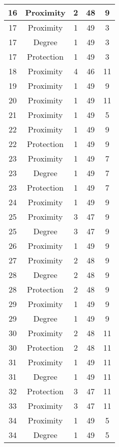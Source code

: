 \documentclass[results.tex]{subfiles}
\begin{document}
\begin{center}
\begin{tabular}{| c || c | c | c | c |}
    \hline
    16 & Proximity & 2 & 48 & 9 \\ 
    \hline
    17 & Proximity & 1 & 49 & 3 \\ 
    \hline
    17 & Degree & 1 & 49 & 3 \\ 
    \hline
    17 & Protection & 1 & 49 & 3 \\ 
    \hline
    18 & Proximity & 4 & 46 & 11 \\ 
    \hline
    19 & Proximity & 1 & 49 & 9 \\ 
    \hline
    20 & Proximity & 1 & 49 & 11 \\ 
    \hline
    21 & Proximity & 1 & 49 & 5 \\ 
    \hline
    22 & Proximity & 1 & 49 & 9 \\ 
    \hline
    22 & Protection & 1 & 49 & 9 \\ 
    \hline
    23 & Proximity & 1 & 49 & 7 \\ 
    \hline
    23 & Degree & 1 & 49 & 7 \\ 
    \hline
    23 & Protection & 1 & 49 & 7 \\ 
    \hline
    24 & Proximity & 1 & 49 & 9 \\ 
    \hline
    25 & Proximity & 3 & 47 & 9 \\ 
    \hline
    25 & Degree & 3 & 47 & 9 \\ 
    \hline
    26 & Proximity & 1 & 49 & 9 \\ 
    \hline
    27 & Proximity & 2 & 48 & 9 \\ 
    \hline
    28 & Degree & 2 & 48 & 9 \\ 
    \hline
    28 & Protection & 2 & 48 & 9 \\ 
    \hline
    29 & Proximity & 1 & 49 & 9 \\ 
    \hline
    29 & Degree & 1 & 49 & 9 \\ 
    \hline
    30 & Proximity & 2 & 48 & 11 \\ 
    \hline
    30 & Protection & 2 & 48 & 11 \\ 
    \hline
    31 & Proximity & 1 & 49 & 11 \\ 
    \hline
    31 & Degree & 1 & 49 & 11 \\ 
    \hline
    32 & Protection & 3 & 47 & 11 \\ 
    \hline
    33 & Proximity & 3 & 47 & 11 \\ 
    \hline
    34 & Proximity & 1 & 49 & 5 \\ 
    \hline
    34 & Degree & 1 & 49 & 5 \\ 

\end{tabular}
\end{center}
\end{document}
